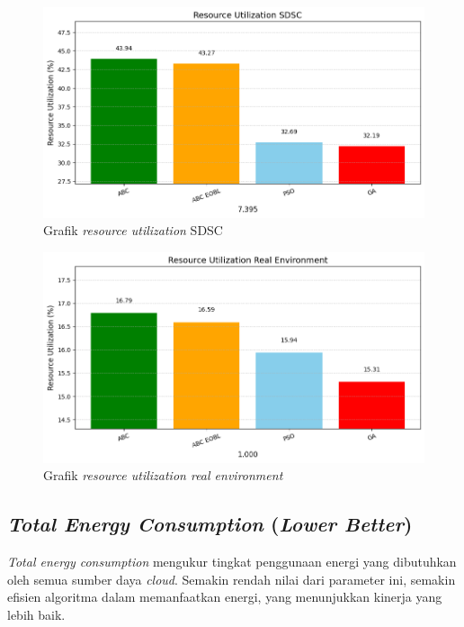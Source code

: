 \newpage

\begin{figure} [H]
    \centering
    \includegraphics[width=0.75\linewidth]{gambar/Grafik Resource Utilization SDSC.png}
    \caption{Grafik \textit{resource utilization} SDSC}
\end{figure}

\begin{figure} [H]
    \centering
    \includegraphics[width=0.75\linewidth]{gambar/Grafik Resource Utilization Real Environment.png}
    \caption{Grafik \textit{resource utilization real environment}}
\end{figure}

\subsection{\textit{Total Energy Consumption} (\textit{Lower Better})}
\textit{Total energy consumption} mengukur tingkat penggunaan energi yang dibutuhkan oleh semua sumber daya \textit{cloud}. Semakin rendah nilai dari parameter ini, semakin efisien algoritma dalam memanfaatkan energi, yang menunjukkan kinerja yang lebih baik.

\newpage

